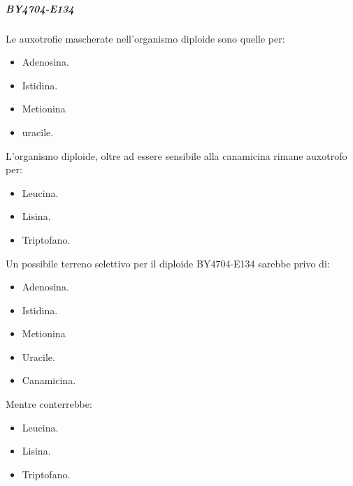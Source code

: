 				\subparagraph*{BY4704-E134}
				Le auxotrofie mascherate nell'organismo diploide sono quelle per:
				\begin{multicols}{4}
					\begin{itemize}
						\item Adenosina.
						\item Istidina.
						\item Metionina
						\item uracile.
					\end{itemize}
				\end{multicols}
				L'organismo diploide, oltre ad essere sensibile alla canamicina rimane auxotrofo per:
				\begin{multicols}{3}
					\begin{itemize}
						\item Leucina.
						\item Lisina.
						\item Triptofano.
					\end{itemize}
				\end{multicols}
				Un possibile terreno selettivo per il diploide BY4704-E134 sarebbe privo di:
				\begin{multicols}{4}
					\begin{itemize}
						\item Adenosina.
						\item Istidina.
						\item Metionina
						\item Uracile.
						\item Canamicina.
					\end{itemize}
				\end{multicols}
				Mentre conterrebbe:
				\begin{multicols}{3}
					\begin{itemize}
						\item Leucina.
						\item Lisina.
						\item Triptofano.
					\end{itemize}
				\end{multicols}


